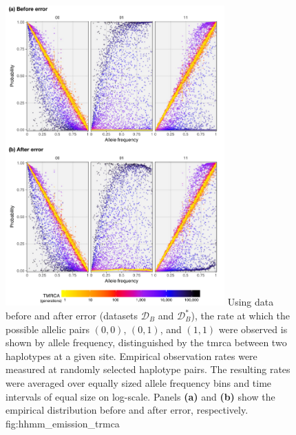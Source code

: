 

\begin{figure}[!htb]
\centering
\includegraphics[width=0.75\textwidth]{./img/ch5/hhmm_emission_tmrca_lowres}
{Using data before and after error (datasets $\mathcal{D}_B$ and $\mathcal{D}_B^{\ast}$), the rate at which the possible allelic pairs $(0,0)$, $(0,1)$, and $(1,1)$ were observed is shown by allele frequency, distinguished by the \gls{tmrca} between two haplotypes at a given site.
Empirical observation rates were measured at  randomly selected haplotype pairs.
The resulting rates were averaged over  equally sized allele frequency bins and  time intervals of equal size on log-scale.
Panels \textbf{(a)} and \textbf{(b)} show the empirical distribution before and after error, respectively.}
{fig:hhmm_emission_trmca}
\end{figure}
